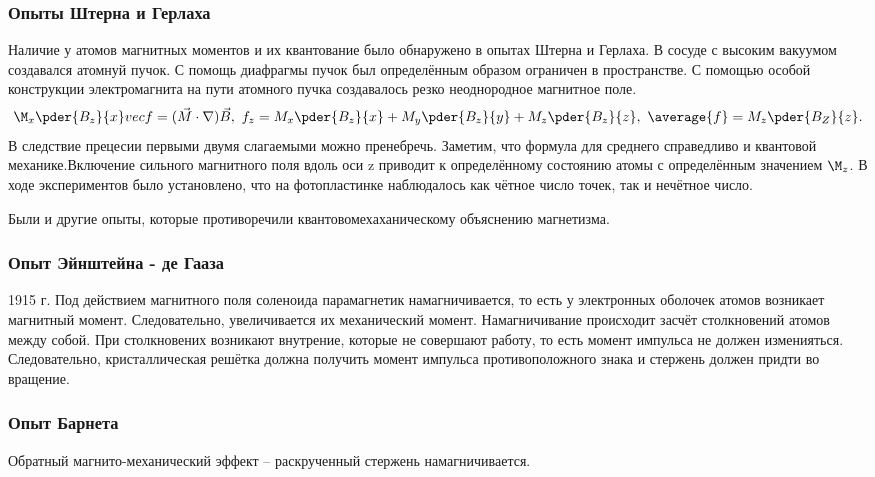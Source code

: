 \subsubsection{Опыты Штерна и Герлаха}
Наличие у атомов магнитных моментов и их квантование было обнаружено в опытах Штерна и Герлаха. В сосуде с высоким вакуумом создавался атомнуй пучок. С помощь диафрагмы пучок был определённым образом ограничен в пространстве. С помощью особой конструкции электромагнита на пути атомного пучка создавалось резко неоднородное магнитное поле.
\[
    \M_x\pder{B_z}{x}vec{f} = (\vec{M}\cdot\nabla)\vec{B},\ f_z = M_x\pder{B_z}{x} + M_y\pder{B_z}{y} + M_z\pder{B_z}{z},\ \average{f} = M_z\pder{B_Z}{z}.
\]
В следствие прецесии первыми двумя слагаемыми можно пренебречь. Заметим, что формула для среднего справедливо и  квантовой механике.Включение сильного магнитного поля вдоль оси z приводит к определённому состоянию атомы с определённым значением \( \M_z \). В ходе экспериментов было установлено, что на фотопластинке наблюдалось как чётное число точек, так и нечётное число.

Были и другие опыты, которые противоречили квантовомехаханическому объяснению магнетизма.

\subsubsection{Опыт Эйнштейна - де Гааза}
1915 г. Под действием магнитного поля соленоида парамагнетик намагничивается, то есть у электронных оболочек атомов возникает магнитный момент. Следовательно, увеличивается их механический момент. Намагничивание происходит засчёт столкновений атомов между собой. При столкновених возникают внутрение, которые не совершают работу, то есть момент импульса не должен изменияться. Следовательно, кристаллическая решётка должна получить момент импульса противоположного знака и стержень должен придти во вращение.
\subsubsection{Опыт Барнета}
Обратный магнито-механический эффект -- раскрученный стержень намагничивается.

